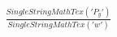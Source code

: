 \documentclass[preview]{standalone}
\begin{document}
\begin{align*}
\frac{SingleStringMathTex('P_y')}{SingleStringMathTex('w')}
\end{align*}
\end{document}
